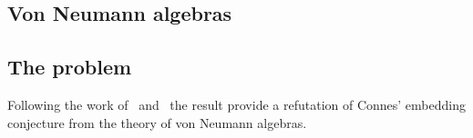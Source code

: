 
\subsection{Von Neumann algebras}
\subsection{The problem}
Following the work of~\cite{Tsirelson_1} and~\cite{Tsirelson_2} the result provide a refutation of Connes' embedding conjecture from the theory of von Neumann algebras.